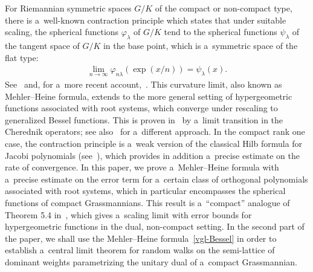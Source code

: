 \documentclass[11pt]{article}
\numberwithin{equation}{section}
\begin{document}
For Riemannian symmetric spaces $G/K$ of the compact or non-compact type, there is a~well-known contraction principle
which states that under suitable scaling, the spherical functions $\varphi_\lambda$ of $G/K$ tend to the spherical
functions $\psi_\lambda$ of the tangent space of $G/K$ in the base point, which is a~symmetric space of the f\/lat type:
\begin{gather*}
\lim_{n\to\infty} \varphi_{n\lambda}(\exp(x/n))=\psi_\lambda(x).
\end{gather*}
See~\cite{C} and, for a~more recent account,~\cite{BO}.
This curvature limit, also known as Mehler--Heine formula, extends to the more general setting of hypergeometric
functions associated with root systems, which converge under rescaling to generalized Bessel functions.
This is proven in~\cite{dJ} by a~limit transition in the Cherednik operators; see also~\cite{BO} for a~dif\/ferent
approach.
In the compact rank one case, the contraction principle is a~weak version of the classical Hilb formula for Jacobi
polynomials (see~\cite[Theorem 8.21.12]{Sz}), which provides in addition a~precise estimate on the rate of
convergence.
In this paper, we prove a~Mehler--Heine formula with a~precise estimate on the error term
for a~certain class of orthogonal polynomials associated with root systems, which in particular encompasses the
spherical functions of compact Grassmannians.
This result is a~``compact'' analogue of Theorem 5.4 in~\cite{RV2}, which gives a~scaling limit with error bounds for
hypergeometric functions in the dual, non-compact setting.
In the second part of the paper, we shall use the Mehler--Heine formula~\ref{vgl-Bessel} in order to establish a~central
limit theorem for random walks on the semi-lattice of dominant weights parametrizing the unitary dual of a~compact
Grassmannian.
\end{document}
